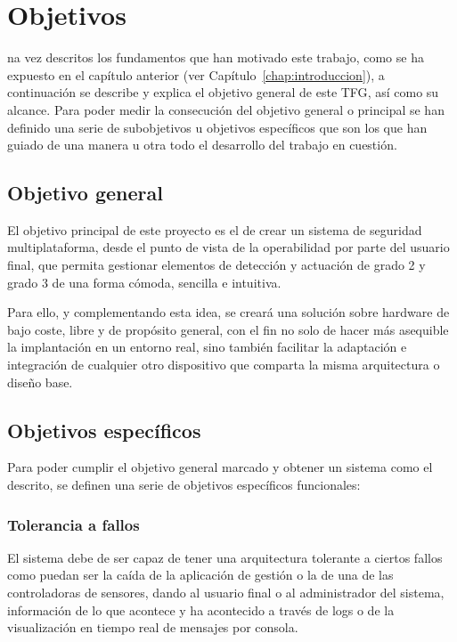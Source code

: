 \chapter{Objetivos}
\label{chap:objetivos}

na vez descritos los fundamentos que han motivado este trabajo, como se ha expuesto en el capítulo anterior (ver Capítulo~\ref{chap:introduccion}), a continuación se describe y explica el objetivo general de este \acs{TFG}, así como su alcance. Para poder medir la consecución del objetivo general o principal se han definido una serie de subobjetivos u objetivos específicos que son los que han guiado de una manera u otra todo el desarrollo del trabajo en cuestión.

\section{Objetivo general}

El objetivo principal de este proyecto es el de crear un sistema de seguridad multiplataforma, desde el punto de vista de la operabilidad por parte del usuario final, que permita gestionar elementos de detección y actuación de grado 2 y grado 3 de una forma cómoda, sencilla e intuitiva.

Para ello, y complementando esta idea, se creará una solución sobre hardware de bajo coste, libre y de propósito general, con el fin no solo de hacer más asequible la implantación en un entorno real, sino también facilitar la adaptación e integración de cualquier otro dispositivo que comparta la misma arquitectura o diseño base.


\section{Objetivos específicos}

Para poder cumplir el objetivo general marcado y obtener un sistema como el descrito, se definen una serie de objetivos específicos funcionales:

\subsection{Tolerancia a fallos}
El sistema  debe de ser capaz de  tener una arquitectura  tolerante a
ciertos fallos como puedan ser la  caída de la aplicación de gestión o
la de una  de las controladoras de sensores, dando  al usuario final o
al  administrador del  sistema, información  de lo  que acontece  y ha
acontecido a  través de logs o  de la visualización en  tiempo real de
mensajes por consola.

